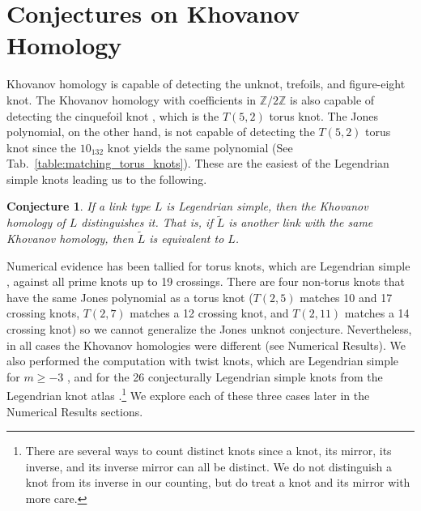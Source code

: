 \documentclass{article}
\theoremstyle{plain}
\newtheorem{conjecture}{Conjecture}
\begin{document}
    \section{Conjectures on Khovanov Homology}
        Khovanov homology is capable of detecting the
        unknot, trefoils, and figure-eight knot. The Khovanov homology with
        coefficients in $\mathbb{Z}/2\mathbb{Z}$ is also capable of detecting
        the cinquefoil knot \cite{BaldwinYingSivekCinquefoilKhovanov},
        which is the $T(5,2)$ torus knot. The Jones
        polynomial, on the other hand, is not capable of detecting the
        $T(5,2)$ torus knot since the $10_{132}$ knot yields the same
        polynomial (See Tab.~\ref{table:matching_torus_knots}).
        These are the easiest of the Legendrian simple knots
        leading us to the following.
        \begin{conjecture}
            If a link type $L$ is Legendrian simple, then the Khovanov homology
            of $L$ distinguishes it. That is, if $\tilde{L}$
            is another link with the same Khovanov homology, then $\tilde{L}$ is
            equivalent to $L$.
        \end{conjecture}
        Numerical evidence has been tallied for torus knots, which are
        Legendrian simple \cite{EtnyreHondaContactTopologyI},
        against all prime knots up to 19 crossings. There are four
        non-torus knots that have the same Jones polynomial as a torus knot
        ($T(2,5)$ matches 10 and 17 crossing knots, $T(2,7)$
        matches a 12 crossing knot, and $T(2,11)$ matches a 14 crossing knot)
        so we cannot generalize the Jones unknot conjecture. Nevertheless, in
        all cases the Khovanov homologies were different
        (see Numerical Results). We also performed the computation
        with twist knots, which are Legendrian simple for $m\geq{-3}$
        \cite{EtnyreEtAlLegendrianAndTransverseTwistKnots}, and for
        the 26 conjecturally Legendrian simple knots from the Legendrian
        knot atlas \cite{LegendrianKnotAtlas}.\footnote{%
            There are several ways to count distinct knots since a knot,
            its mirror, its inverse, and its inverse mirror can all be distinct.
            We do not distinguish a knot from its inverse in our counting,
            but do treat a knot and its mirror with more care.
        }
        We explore each of these three cases later in the Numerical Results
        sections.
        \par\hfill\par
\end{document}
